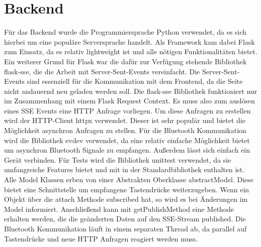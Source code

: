 \section{Backend}
Für das Backend wurde die Programmiersprache Python verwendet, da es sich hierbei um eine populäre Serversprache
handelt. Als Framework kam dabei \glqq Flask\grqq{} zum Einsatz, da es relativ lightweight ist und alle nötigen
Funktionalitäten bietet. Ein weiterer Grund für Flask war die dafür zur Verfügung stehende Bibliothek \glqq
flask-sse\grqq{}, die die Arbeit mit Server-Sent-Events vereinfacht. \newline Die Server-Sent-Events sind essenziell
für die Kommunikation mit dem Frontend, da die Seite nicht andauernd neu geladen werden soll. Die \glqq
flask-sse\grqq{} Bibliothek funktioniert nur im Zusammenhang mit einem Flask Request Context. Es muss also zum
auslösen eines SSE Events eine HTTP Anfrage vorliegen. Um diese Anfragen zu erstellen wird der HTTP-Client \glqq
httpx\grqq{} verwendet. Dieser ist sehr populär und bietet die Möglichkeit asynchron Anfragen zu stellen. \newline
Für die Bluetooth Kommunikation wird die Bibliothek \glqq evdev\grqq{} verwendet, da eine relativ einfache
Möglichkeit bietet um asynchron Bluetooth Signale zu empfangen. Außerdem lässt sich einfach ein Gerät verbinden.
\newline Für Tests wird die Bibliothek \glqq unittest\grqq{} verwendet, da sie umfangreiche Features bietet und mit
in der Standardbibliothek enthalten ist. \newline Alle Model Klassen erben von einer Abstrakten Oberklasse \glqq
abstractModel\grqq{}. Diese bietet eine Schnittstelle um empfangene Tastendrücke weiterzugeben. Wenn ein Objekt über
die \glqq attach\grqq{} Methode subscribed hat, so wird es bei Änderungen im Model informiert. Anschließend kann mit
\glqq getPublishMethod\grqq{} eine Methode erhalten werden, die die geänderten Daten auf den SSE-Stream published.
\newline Die Bluetooth Kommunikation läuft in einem separaten Thread ab, da parallel auf Tastendrücke und neue
HTTP Anfragen reagiert werden muss.
